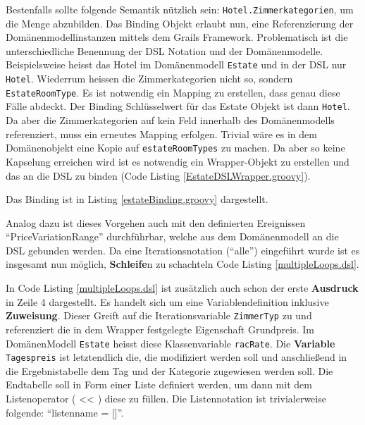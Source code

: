 \documentclass[11pt,english,ngerman, headsepline]{scrreprt}
\begin{document}
Bestenfalls sollte folgende Semantik nützlich sein:
\texttt{Hotel.Zimmerkategorien}, um die Menge abzubilden.
Das Binding Objekt erlaubt nun, eine Referenzierung der Domänenmodellinstanzen
mittels dem Grails Framework. Problematisch ist die unterschiedliche Benennung
der DSL Notation und der Domänenmodelle. Beispielsweise heisst das Hotel im
Domänenmodell \texttt{Estate} und in der DSL nur \texttt{Hotel}. Wiederrum heissen die
Zimmerkategorien nicht so, sondern \texttt{EstateRoomType}. Es ist
notwendig ein Mapping zu erstellen, dass genau diese Fälle abdeckt. Der Binding Schlüsselwert
für das Estate Objekt ist dann \texttt{Hotel}. 
Da aber die Zimmerkategorien auf kein Feld innerhalb des Domänenmodells
referenziert, muss ein erneutes Mapping erfolgen. Trivial wäre es in dem
Domänenobjekt eine Kopie auf \texttt{estateRoomTypes} zu machen. Da aber so keine
Kapselung erreichen wird ist es notwendig ein Wrapper-Objekt zu erstellen und das
an die DSL zu binden (Code Listing \ref{EstateDSLWrapper.groovy}).
 



Das Binding ist in Listing \ref{estateBinding.groovy} dargestellt.



Analog dazu ist dieses Vorgehen auch mit den definierten Ereignissen
``PriceVariationRange'' durchführbar, welche aus dem Domänenmodell an die DSL
gebunden werden. Da eine Iterationsnotation (``alle'') eingeführt wurde ist es
insgesamt nun möglich, {\bf Schleife}n zu schachteln Code Listing
\ref{multipleLoops.dsl}.
 


In Code Listing \ref{multipleLoops.dsl} ist zusätzlich auch schon der erste
{\bf Ausdruck} in Zeile 4 dargestellt. Es handelt sich um
eine Variablendefinition inklusive {\bf Zuweisung}. Dieser Greift auf
die Iterationsvariable \texttt{ZimmerTyp} zu und referenziert die in dem Wrapper
festgelegte Eigenschaft Grundpreis. Im DomänenModell \texttt{Estate} heisst diese
Klassenvariable \texttt{racRate}.
Die {\bf Variable} \texttt{Tagespreis} ist letztendlich die, die modifiziert
werden soll und anschließend in die Ergebnistabelle dem Tag und der
Kategorie zugewiesen werden soll. Die Endtabelle soll in Form einer Liste
definiert werden, um dann mit dem Listenoperator ( << ) diese
zu füllen. Die Listennotation ist trivialerweise folgende: ``listenname = []''.
\end{document}
